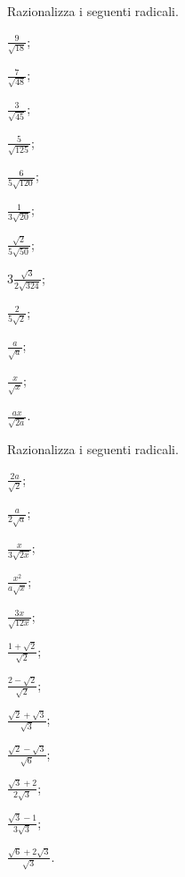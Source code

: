 \begin{esercizio}[\Ast]
 \label{ese:2.86}
Razionalizza i seguenti radicali.
 \begin{multicols}{4}
 \begin{enumeratea}
 \item $\frac 9{\sqrt{18}}$;
 \item $\frac 7{\sqrt{48}}$;
 \item $\frac 3{\sqrt{45}}$;
 \item $\frac 5{\sqrt{125}}$;
 \item $\frac 6{5\sqrt{120}}$;
 \item $\frac 1{3\sqrt{20}}$;
 \item $\frac{\sqrt 2}{5\sqrt{50}}$;
 \item $3\frac{\sqrt 3}{2\sqrt{324}}$;
 \item $\frac {2}{5{\sqrt 2}}$;
 \item $\frac a{\sqrt a}$;
 \item $\frac x{\sqrt x}$;
 \item $\frac{ax}{\sqrt{2a}}$.
 \end{enumeratea}
 \end{multicols}
\end{esercizio}
\pagebreak
\begin{esercizio}[\Ast]
 \label{ese:2.87}
Razionalizza i seguenti radicali.
 \begin{multicols}{4}
 \begin{enumeratea}
 \item $\frac{2a}{\sqrt 2}$;
 \item $\frac a{2\sqrt a}$;
 \item $\frac x{3\sqrt{2x}}$;
 \item $\frac{x^2}{a\sqrt x}$;
 \item $\frac{3x}{\sqrt{12x}}$;
 \item $\frac{1+\sqrt 2}{\sqrt 2}$;
 \item $\frac{2-\sqrt 2}{\sqrt 2}$;
 \item $\frac{\sqrt 2+\sqrt 3}{\sqrt 3}$;
 \item $\frac{\sqrt 2-\sqrt 3}{\sqrt 6}$;
 \item $\frac{\sqrt 3+2}{2\sqrt 3}$;
 \item $\frac{\sqrt 3-1}{3\sqrt 3}$;
 \item $\frac{\sqrt 6+2\sqrt 3}{\sqrt 3}$.
 \end{enumeratea}
 \end{multicols}
\end{esercizio}

